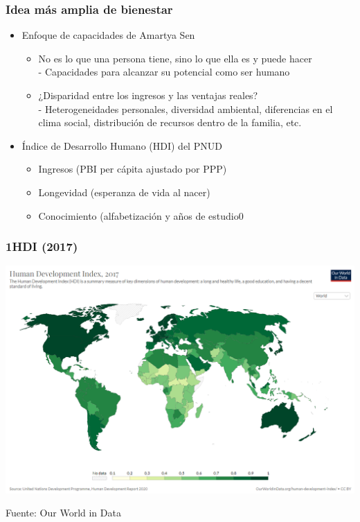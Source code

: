 \documentclass{beamer}
\begin{document}
\begin{frame}
\frametitle{Idea más amplia de bienestar}
\begin{itemize}
    \item Enfoque de capacidades de Amartya Sen
    \begin{itemize}
        \item No es lo que una persona tiene, sino lo que ella es y puede hacer \\
        - Capacidades para alcanzar su potencial como ser humano
        \item ¿Disparidad entre los ingresos y las ventajas reales? \\
        - Heterogeneidades personales, diversidad ambiental, diferencias en el clima social, distribución de recursos dentro de la familia, etc.
    \end{itemize}
    \item Índice de Desarrollo Humano (HDI) del PNUD
    \begin{itemize}
        \item Ingresos (PBI per cápita ajustado por PPP)
        \item Longevidad (esperanza de vida al nacer)
        \item Conocimiento (alfabetización y años de estudio0
    \end{itemize}
    \end{itemize}
\end{frame}

\begin{frame}
\frametitle{1HDI (2017)}
\begin{center}
    \href{https://ourworldindata.org/grapher/human-development-index?country=~ZWE} {\includegraphics[scale=0.35]{Figures/Tema_11.27_hdi_PBI.png}}
\end{center}
Fuente: Our World in Data
\end{frame}
\end{document}
